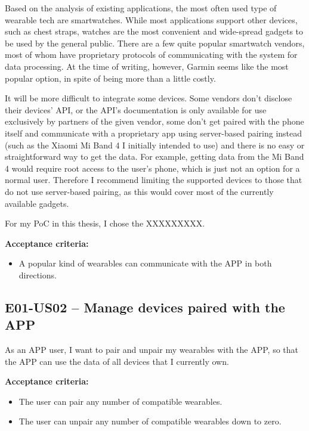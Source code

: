Based on the analysis of existing applications, the most often used type of wearable tech are smartwatches.
While most applications support other devices, such as chest straps, watches are the most convenient and wide-spread gadgets to be used by the general public.
There are a few quite popular smartwatch vendors, most of whom have proprietary protocols of communicating with the system for data processing.
At the time of writing, however, Garmin seems like the most popular option, in spite of being more than a little costly.

It will be more difficult to integrate some devices.
Some vendors don't disclose their devices' API, or the API's documentation is only available for use exclusively by partners of the given vendor,
some don't get paired with the phone itself and communicate with a proprietary app using server-based pairing instead (such as the Xiaomi Mi Band 4 I initially intended to use) and there is no easy or straightforward way to get the data.
For example, getting data from the Mi Band 4 would require root access to the user's phone\cite{miband4-server-based}, which is just not an option for a normal user.
Therefore I recommend limiting the supported devices to those that do not use server-based pairing, as this would cover most of the currently available gadgets.

For my PoC in this thesis, I chose the XXXXXXXXX.

\textbf{Acceptance criteria:}
\begin{itemize}
    \item A popular kind of wearables can communicate with the APP in both directions.
\end{itemize}

\subsection*{E01-US02 -- Manage devices paired with the APP}
As an APP user, I want to pair and unpair my wearables with the APP, so that the APP can use the data of all devices that I currently own.

\textbf{Acceptance criteria:}
\begin{itemize}
    \item The user can pair any number of compatible wearables.
    \item The user can unpair any number of compatible wearables down to zero.
\end{itemize}

